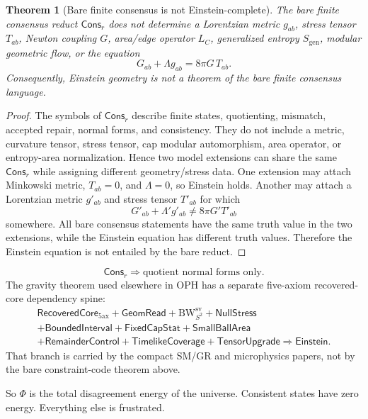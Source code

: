 \documentclass[11pt]{article}
\newtheorem{theorem}{Theorem}[section]
\theoremstyle{remark}
\theoremstyle{plain}
\begin{document}
\begin{theorem}[Bare finite consensus is not Einstein-complete]
\label{thm:bare-consensus-not-einstein-complete}
The bare finite consensus reduct \(\mathsf{Cons}_r\) does not determine a
Lorentzian metric \(g_{ab}\), stress tensor \(T_{ab}\), Newton coupling \(G\),
area/edge operator \(L_C\), generalized entropy \(S_{\mathrm{gen}}\), modular
geometric flow, or the equation
\[
G_{ab}+\Lambda g_{ab}=8\pi G\,T_{ab}.
\]
Consequently, Einstein geometry is not a theorem of the bare finite consensus
language.
\end{theorem}

\begin{proof}
The symbols of \(\mathsf{Cons}_r\) describe finite states, quotienting,
mismatch, accepted repair, normal forms, and consistency. They do not include a
metric, curvature tensor, stress tensor, cap modular automorphism, area
operator, or entropy-area normalization. Hence two model extensions can share
the same \(\mathsf{Cons}_r\) while assigning different geometry/stress data.
One extension may attach Minkowski metric, \(T_{ab}=0\), and \(\Lambda=0\), so
Einstein holds. Another may attach a Lorentzian metric \(g'_{ab}\) and stress
tensor \(T'_{ab}\) for which
\[
G'_{ab}+\Lambda' g'_{ab}\ne 8\pi G' T'_{ab}
\]
somewhere. All bare consensus statements have the same truth value in the two
extensions, while the Einstein equation has different truth values. Therefore
the Einstein equation is not entailed by the bare reduct.
\end{proof}

\[
\boxed{
\mathsf{Cons}_r\Rightarrow\text{quotient normal forms only.}
}
\]
The gravity theorem used elsewhere in OPH has a separate five-axiom
recovered-core dependency spine:
\[
\boxed{
\begin{gathered}
\mathsf{RecoveredCore}_{5\mathrm{ax}}+\mathsf{GeomRead}
+\mathrm{BW}^{\mathrm{sv}}_{S^2}
+\mathsf{NullStress}\\
+\mathsf{BoundedInterval}
+\mathsf{FixedCapStat}
+\mathsf{SmallBallArea}\\
+\mathsf{RemainderControl}
+\mathsf{TimelikeCoverage}
+\mathsf{TensorUpgrade}
\Rightarrow
\mathsf{Einstein}.
\end{gathered}
}
\]
That branch is carried by the compact SM/GR and microphysics papers, not by the
bare constraint-code theorem above.

So $\Phi$ is the total disagreement energy of the universe. Consistent states have zero energy. Everything else is frustrated.
\end{document}
